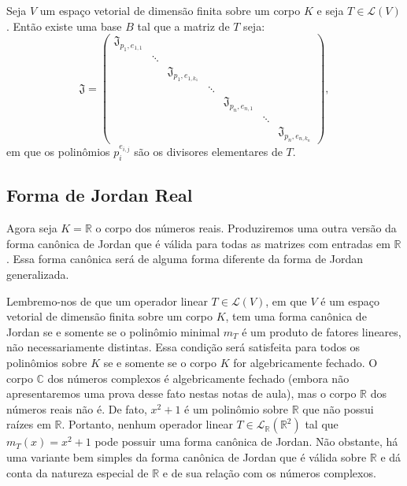 \documentclass[11pt,twoside,a4paper]{book}
\begin{document}
\begin{teorema}
Seja $V$ um espaço vetorial de dimensão finita sobre um corpo $K$ e seja $T\in\mathcal{L}(V)$.
Então existe uma base $B$ tal que a matriz de $T$ seja:
\[
\mathfrak{J}=\begin{pmatrix}
\mathfrak{J}_{p_1,e_{1,1}}&&&&&&\\&\ddots&&&&&\\&&\mathfrak{J}_{p_1,e_{1,k_1}}&&&&\\&&&\ddots&&&\\&&&&\mathfrak{J}_{p_n,e_{n,1}}&&\\&&&&&\ddots&\\&&&&&&\mathfrak{J}_{p_n,e_{n,k_n}}
\end{pmatrix},
\]
em que os polinômios $p_i^{e_{i,j}}$ são os divisores elementares de $T$.
\end{teorema}

\subsection{Forma de Jordan Real}

Agora seja $K=\mathbb{R}$ o corpo dos números reais. Produziremos uma outra versão
da forma canônica de Jordan que é válida para todas as matrizes
com entradas em $\mathbb{R}$. Essa forma canônica será de alguma forma diferente da
forma de Jordan generalizada.

\medskip
\noindent
Lembremo-nos de que um operador linear $T\in\mathcal{L}(V)$, em que
$V$ é um espaço vetorial de dimensão finita sobre um corpo $K$, tem uma forma canônica de Jordan se e somente se o polinômio minimal $m_T$ é um produto de fatores lineares, não necessariamente distintas. Essa condição
será satisfeita para todos os polinômios sobre $K$ se e somente se o corpo $K$ for
algebricamente fechado. O corpo $\mathbb{C}$ dos números complexos é algebricamente fechado
(embora não apresentaremos uma prova desse fato nestas notas de aula), mas o corpo
$\mathbb{R}$ dos números reais não é. De fato, $x^2+1$ é um polinômio sobre $\mathbb{R}$ que não possui raízes em $\mathbb{R}$. Portanto, nenhum operador linear $T\in\mathcal{L}_{\mathbb{R}}(\mathbb{R}^2)$
tal que $m_T(x) = x^2 + 1$ pode possuir uma forma canônica de Jordan. Não obstante, há uma variante bem simples da forma canônica de Jordan que é válida sobre $\mathbb{R}$ e dá conta da natureza especial de $\mathbb{R}$ e de sua relação com os números complexos.
\end{document}
